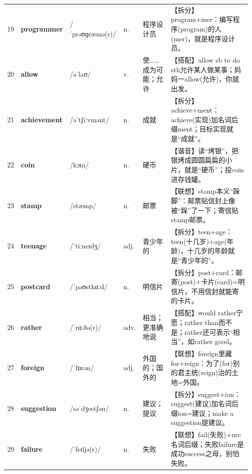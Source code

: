 \documentclass[UTF8,a4paper,11pt,oneside]{ctexbook}
\newcommand{\cellword}[1]{{\bfseries\textcolor{wordcol}{#1}}}
\newcommand{\cellipa}[1]{{\footnotesize\textcolor{ipacol}{#1}}}
\newcommand{\cellpos}[1]{\textcolor{poscol}{#1}}
\newcommand{\cellno}[1]{\textcolor{volcolor!75!black}{#1}}
\begin{document}
{\begin{longtable}{@{}C{0.045\textwidth}L{0.155\textwidth}L{0.175\textwidth}C{0.070\textwidth}L{0.180\textwidth}L{0.282\textwidth}@{}}
 \cellno{19} & \cellword{programmer} & \cellipa{/ˈprəʊɡræmə(r)/} & \cellpos{n.} & 程序设计员 & \textcolor{tagSplit}{【拆分】}program+mer：编写程序(program)的人(mer)，就是程序设计员。 \\
\cellno{20} & \cellword{allow} & \cellipa{/əˈlaʊ/} & \cellpos{v.} & 使……成为可能；允许 & \textcolor{tagColloc}{【搭配】}allow sb to do sth允许某人做某事；妈妈一allow(允许)，你就出发。 \\
 \cellno{21} & \cellword{achievement} & \cellipa{/əˈtʃiːvmənt/} & \cellpos{n.} & 成就 & \textcolor{tagSplit}{【拆分】}achieve+ment：achieve(实现)加名词后缀ment；目标实现就是“成就”。 \\
\cellno{22} & \cellword{coin} & \cellipa{/kɔɪn/} & \cellpos{n.} & 硬币 & \textcolor{tagSound}{【谐音】}读“烤银”，把银烤成圆圆扁扁的小片，就是“硬币”；投coin进存钱罐。 \\
 \cellno{23} & \cellword{stamp} & \cellipa{/stæmp/} & \cellpos{n.} & 邮票 & \textcolor{tagAssoc}{【联想】}stamp本义“跺脚”：邮票贴信封上像被“跺”了一下；寄信贴stamp邮票。 \\
\cellno{24} & \cellword{teenage} & \cellipa{/ˈtiːneɪdʒ/} & \cellpos{adj.} & 青少年的 & \textcolor{tagSplit}{【拆分】}teen+age：teen(十几岁)+age(年龄)，十几岁的年龄就是“青少年的”。 \\
 \cellno{25} & \cellword{postcard} & \cellipa{/ˈpəʊstkɑːd/} & \cellpos{n.} & 明信片 & \textcolor{tagSplit}{【拆分】}post+card：邮寄(post)+卡片(card)=明信片，不用信封就能寄的卡片。 \\
\cellno{26} & \cellword{rather} & \cellipa{/ˈrɑːðə(r)/} & \cellpos{adv.} & 相当；更准确地说 & \textcolor{tagColloc}{【搭配】}would rather宁愿；rather than而不是；rather还可表示“相当”，如rather good。 \\
 \cellno{27} & \cellword{foreign} & \cellipa{/ˈfɒrən/} & \cellpos{adj.} & 外国的；国外的 & \textcolor{tagAssoc}{【联想】}foreign里藏for+reign：为了(for)别的君主统(reign)治的土地=外国。 \\
\cellno{28} & \cellword{suggestion} & \cellipa{/səˈdʒestʃən/} & \cellpos{n.} & 建议；提议 & \textcolor{tagSplit}{【拆分】}suggest+ion：suggest(建议)加名词后缀ion=建议；make a suggestion提建议。 \\
 \cellno{29} & \cellword{failure} & \cellipa{/ˈfeɪljə(r)/} & \cellpos{n.} & 失败 & \textcolor{tagAssoc}{【联想】}fail(失败)+ure名词后缀；失败failure是成功success之母，别怕失败。 \\

\end{longtable}}
\end{document}

